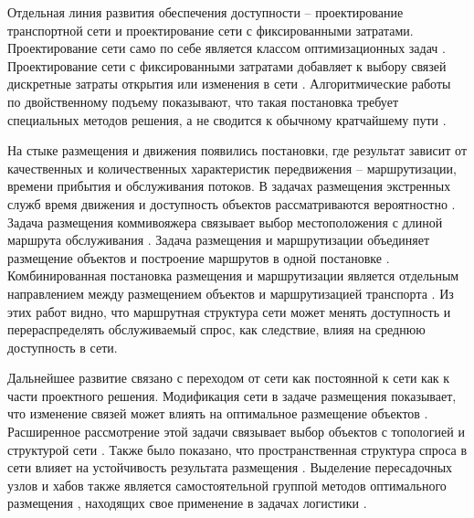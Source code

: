 
Отдельная линия развития обеспечения доступности -- проектирование транспортной сети и проектирование сети с фиксированными затратами. Проектирование сети само по себе является классом оптимизационных задач \cite{magnanti1984networkDesign}. Проектирование сети с фиксированными затратами добавляет к выбору связей дискретные затраты открытия или изменения в сети \cite{powell1989networkDesign}. Алгоритмические работы по двойственному подъему показывают, что такая постановка требует специальных методов решения, а не сводится к обычному кратчайшему пути \cite{balakrishnan1989dualAscent}.

На стыке размещения и движения появились постановки, где результат зависит от качественных и количественных характеристик передвижения -- маршрутизации, времени прибытия и обслуживания потоков. В задачах размещения экстренных служб время движения и доступность объектов рассматриваются вероятностно \cite{daskin1987emergency}. Задача размещения коммивояжера связывает выбор местоположения с длиной маршрута обслуживания \cite{simchi1988tspLocation}. Задача размещения и маршрутизации объединяет размещение объектов и построение маршрутов в одной постановке \cite{laporte1988locationRouting}. Комбинированная постановка размещения и маршрутизации является отдельным направлением между размещением объектов и маршрутизацией транспорта \cite{min1998locationRouting}. Из этих работ видно, что маршрутная структура сети может менять доступность и перераспределять обслуживаемый спрос, как следствие, влияя на среднюю доступность в сети.


Дальнейшее развитие связано с переходом от сети как постоянной к сети как к части проектного решения. Модификация сети в задаче размещения показывает, что изменение связей может влиять на оптимальное размещение объектов \cite{berman1992networkModification}. Расширенное рассмотрение этой задачи связывает выбор объектов с топологией и структурой сети \cite{hodgson1992networkLocation}. Также было показано, что пространственная структура спроса в сети влияет на устойчивость результата размещения \cite{peeters1995spatialStructure}. Выделение пересадочных узлов и хабов также является самостоятельной группой методов оптимального размещения \cite{campbell1994hub}, находящих свое применение в задачах логистики \cite{klincewicz1998hub} \cite{revelle1996plantLocation}.

